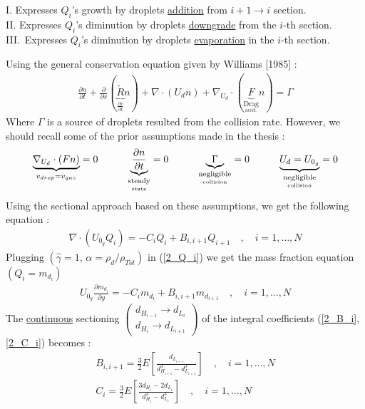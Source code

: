\documentclass[12pt]{article}
\newcommand\tab[1][1cm]{\hspace*{#1}}
\numberwithin{equation}{section}
\begin{document}
\begin{flushleft}
I. \hspace{2.45mm} Expresses $Q_i$’s growth \hspace{5.75mm} by droplets \underline{addition} from $i + 1 \rightarrow i$ section. \\
II. \hspace{1.0mm} Expresses $Q_i$’s diminution by droplets \underline{downgrade} from the $i$-th section. \\
III.\, Expresses $Q_i$’s diminution by droplets \underline{evaporation} in the $i$-th section.

Using the general conservation equation given by Williams [1985] :
\begin{align} 
\frac{ \partial n}{ \partial t} + \frac{ \partial}{ \partial v} ( \underbrace{\tilde{R}}_{ \frac{\partial v}{\partial t}} n ) + \nabla \cdot ( U_d n ) + \nabla_{U_d} \cdot ( \underbrace{F}_{  \underset{ \text{accel.}}{\text{Drag}}} n ) = \Gamma
\end{align} 
Where $\Gamma$ is a source of droplets resulted from the collision rate. However, we should recall some of the prior assumptions made in the thesis :
\begin{align}
\underbrace{\nabla_{U_{d}} \cdot(F n)}_{v_{d r o p}=v_{g a s}}=0 \tab \underbrace{\frac{\partial n}{\partial t}}_{ \underset{\text {state}}{\text{steady}} }=0 \tab \underbrace{\Gamma}_{ \underset{\text {collision}}{\text{negligible}} }=0 \tab \underbrace{U_{d}=U_{0_{g}}}_{\underset{\text {collision}}{\text{negligible}} }=0
\end{align}  
Using the sectional approach based on these assumptions, we get the following equation :
\begin{align}
\nabla \cdot\left(U_{0_{g}} Q_{i}\right)=-C_{i} Q_{i}+B_{i, i+1} Q_{i+1} \quad, \quad i=1, \dots, N
\end{align}
Plugging $\left(\hat{\gamma}=1, \, \alpha=\rho_{d} / \rho_{T o t}\right)$ in (\ref{2_Q_i}) we get the mass fraction equation $\left(Q_{i}=m_{d_{i}}\right)$
\begin{align}
U_{0_{g}} \frac{\partial m_{d_{i}}}{\partial y}=-C_{i} m_{d_{i}}+B_{i, i+1} m_{d_{i+1}} \quad, \quad i=1, \ldots, N
\end{align}
The \underline{continuous} sectioning $\left(\begin{array}{c}d_{H_{i-1}} \rightarrow d_{L_{i}} \\ d_{H_{i}} \rightarrow d_{L_{i+1}}\end{array}\right)$ of the integral coefficients (\ref{2_B_i}, \ref{2_C_i}) becomes :
\begin{align}
B_{i, i+1}= \frac{3}{2} E\left[\frac{d_{L_{i+1}}}{d_{H_{i+1}}^{3}-d_{L_{i+1}}^{3}}\right]  \quad , \quad i=1, \ldots, N \\
C_{i} =\frac{3}{2} E\left[\frac{3 d_{H_{i}}-2 d_{L_{i}}}{d_{H_{i}}^{3}-d_{L_{i}}^{3}}\right] \quad, \quad i=1, \ldots, N 
\end{align}


\end{flushleft}
\end{document}

